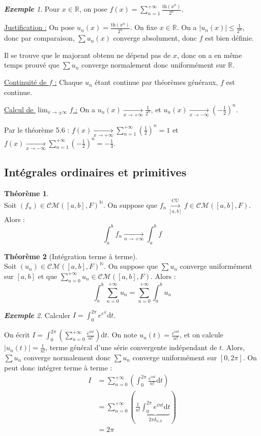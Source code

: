 \documentclass[12pt]{book}
\let\ensembleNombre\mathbb
\newcommand*\N{\ensuremath{\ensembleNombre{N}}}
\newcommand*\R{\ensuremath{\ensembleNombre{R}}}
\newcommand{\limite}[2]{\ensuremath{\underset{#1 \to #2}{\longrightarrow}}}
\newcommand{\lu}[1]{\ensuremath{\overset{\mathrm{CU}}{\underset{#1}{\longrightarrow}}}}
\renewcommand{\th}{\mathrm{th}}
\theoremstyle{definition}
\newtheorem{thme}{Théorème}[chapter]
\theoremstyle{remark}
\newtheorem*{ex}{\textbf{Exemple}}
\newenvironment{fthme}
  {\begin{mdframed}[roundcorner=10pt, linewidth=2pt]\begin{thme}}
  {\end{thme}\end{mdframed}}
\begin{document}
	\begin{ex}
	Pour $x \in \R$, on pose $f(x) = \sum_{n=1}^{+\infty} \frac{\th (x^n)}{2^n}$.
	
	\underline{Justification :} On pose $u_n(x) = \frac{\th (x^n)}{2^n}$. On fixe $x \in \R$. On a $|u_n(x)| \leq \frac{1}{2^n}$, donc par comparaison, $\sum u_n(x)$ converge absolument, donc $f$ est bien définie. 
	
	Il se trouve que le majorant obtenu ne dépend pas de $x$, donc on a en même temps prouvé que $\sum u_n$ converge normalement donc uniformément sur $\R$.
	
	\underline{Continuité de $f$ :} Chaque $u_n$ étant continue par théorèmes généraux, $f$ est continue.
	
	\underline{Calcul de $\lim_{x\to \pm\infty} f$ :} On a $u_n(x) \limite{x}{+\infty} \frac{1}{2^n}$, et $u_n(x) \limite{x}{-\infty} \left( -\frac{1}{2} \right)^n$.
	
	Par le théorème 5.6 : $f(x) \limite{x}{+\infty} \sum_{n=1}^{+\infty} \left( \frac{1}{2} \right)^n = 1$ et $f(x) \limite{x}{-\infty} \sum_{n=1}^{+\infty} \left( -\frac{1}{2} \right)^n = - \frac{1}{3}$.
	\end{ex}
	
		\subsection{Intégrales ordinaires et primitives}
	\begin{fthme}\mbox{~}\\
	Soit $(f_n) \in \mathcal{CM}([a,b], F)^\N$. On suppose que $f_n \lu{[a,b]} f \in \mathcal{CM}([a,b], F)$. Alors :
	\[ \int_a^b f_n \limite{n}{+\infty} \int_a^b f \]
	\end{fthme}
	
	\begin{fthme}[Intégration terme à terme]\mbox{~}\\
	Soit $(u_n) \in \mathcal{CM}([a,b], F)^\N$. On suppose que $\sum u_n$ converge uniformément sur $[a,b]$ et que $\sum_{n=0}^{+\infty} u_n \in \mathcal{CM}([a,b], F)$. Alors :
	\[ \int_a^b \sum_{n=0}^{+\infty} u_n = \sum_{n=0}^{+\infty} \int_a^b u_n \]
	\end{fthme}
	
	\begin{ex}
	Calculer $I = \int_0^{2\pi} e^{e^{it}}\mathrm dt$.
	
	On écrit $I = \int_{0}^{2\pi} \left( \sum_{n=0}^{+\infty} \frac{e^{int}}{n!} \right) \mathrm dt$. On note $u_n(t) = \frac{e^{int}}{n!}$, et on calcule $|u_n(t)| = \frac{1}{n!}$, terme général d'une série convergente indépendant de $t$. Alors, $\sum u_n$ converge normalement donc $\sum u_n$ converge uniformément sur $[0, 2\pi]$. On peut donc intégrer terme à terme :
	\begin{align*}
	I &= \sum_{n=0}^{+\infty} \left( \int_0^{2\pi} \frac{e^{int}}{n!}\mathrm dt \right) \\
	&= \sum_{n=0}^{+\infty} \left(\frac{1}{n!} \underbrace{\int_0^{2\pi} e^{int}\mathrm dt}_{2\pi \delta_{n,0}}\right)\\
	&= 2\pi
	\end{align*}
	\end{ex}
	
\end{document}
